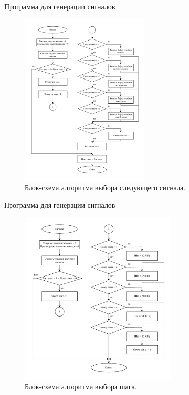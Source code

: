 \documentclass[10pt]{beamer}
\begin{document}
\begin{frame}{Программа для генерации сигналов}
  \begin{figure}
  \includegraphics[width=0.55\textwidth]{plus_signal}
  \caption{Блок-схема алгоритма выбора следующего сигнала.}
  \end{figure}
\end{frame}

\begin{frame}{Программа для генерации сигналов}
  \begin{figure}
  \includegraphics[width=0.675\textwidth]{step_select}
  \caption{Блок-схема алгоритма выбора шага.}
  \end{figure}
\end{frame}
\end{document}
